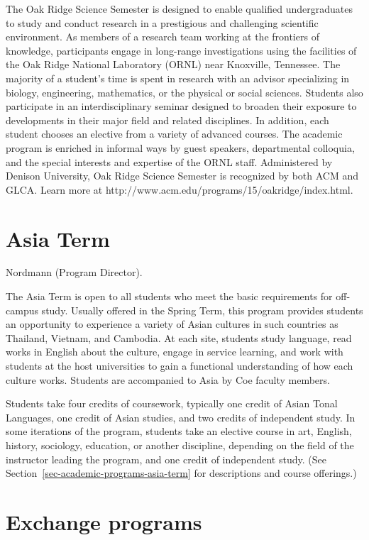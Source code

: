 \documentclass[
  letterpaper,
]{scrbook}
\begin{document}
The Oak Ridge Science Semester is designed to enable qualified
undergraduates to study and conduct research in a prestigious and
challenging scientific environment. As members of a research team
working at the frontiers of knowledge, participants engage in long-range
investigations using the facilities of the Oak Ridge National Laboratory
(ORNL) near Knoxville, Tennessee. The majority of a student's time is
spent in research with an advisor specializing in biology, engineering,
mathematics, or the physical or social sciences. Students also
participate in an interdisciplinary seminar designed to broaden their
exposure to developments in their major field and related disciplines.
In addition, each student chooses an elective from a variety of advanced
courses. The academic program is enriched in informal ways by guest
speakers, departmental colloquia, and the special interests and
expertise of the ORNL staff. Administered by Denison University, Oak
Ridge Science Semester is recognized by both ACM and GLCA. Learn more at
http://www.acm.edu/programs/15/oakridge/index.html.

\section{Asia Term}\label{sec-asia-term}

Nordmann (Program Director).

The Asia Term is open to all students who meet the basic requirements
for off-campus study. Usually offered in the Spring Term, this program
provides students an opportunity to experience a variety of Asian
cultures in such countries as Thailand, Vietnam, and Cambodia. At each
site, students study language, read works in English about the culture,
engage in service learning, and work with students at the host
universities to gain a functional understanding of how each culture
works. Students are accompanied to Asia by Coe faculty members.

Students take four credits of coursework, typically one credit of Asian
Tonal Languages, one credit of Asian studies, and two credits of
independent study. In some iterations of the program, students take an
elective course in art, English, history, sociology, education, or
another discipline, depending on the field of the instructor leading the
program, and one credit of independent study. (See
Section~\ref{sec-academic-programs-asia-term} for descriptions and
course offerings.)

\section{Exchange programs}\label{exchange-programs}
\end{document}
